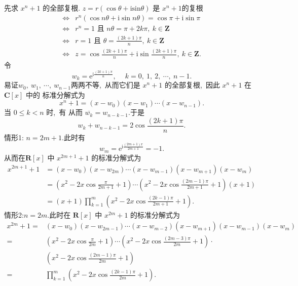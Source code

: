 \begin{solution}
	先求 $ x^{n}+1 $ 的全部复根.
	$z=r(\cos \theta+\mathrm{isin} \theta) $ 是 $ x^{n}+1  $的复根
	$$\begin{aligned}
		\Longleftrightarrow & r^{n}(\cos n \theta+\mathrm{i} \sin n \theta)=\cos \pi+\mathrm{i} \sin \pi \\
		\Longleftrightarrow & r^{n}=1 \text { 且 } n \theta=\pi+2 k \pi,\  k \in \mathbf{Z} \\
		\Longleftrightarrow & r=1 \text { 且 } \theta=\frac{(2 k+1) \pi}{n},\  k \in \mathbf{Z} \\
		\Longleftrightarrow & z=\cos \frac{(2 k+1) \pi}{n}+\mathrm{i} \sin \frac{(2 k+1) \pi}{n},\  k \in \mathbf{Z} .
	\end{aligned}$$
	令$$w_{k}=\mathrm{e}^{\mathrm{i} \frac{(2 k+1) \pi}{n}},\  \quad k=0,\ 1,\ 2,\  \cdots,\  n-1 .$$
	易证$  w_{0},\  w_{1},\  \cdots,\  w_{n-1}  $两两不等,\  从而它们是  $x^{n}+1 $ 的全部复根,\  因此 $ x^{n}+1$  在$  \mathbf{C}[x]$  中的 标准分解式为
	$$x^{n}+1=\left(x-w_{0}\right)\left(x-w_{1}\right) \cdots\left(x-w_{n-1}\right) .$$
	当 $ 0 \leqslant k<n $ 时,\  有
	从而  $\overline{w_{k}}=w_{n-k-1}  .$于是
	$$w_{k}+w_{n-k-1}=2 \cos \frac{(2 k+1) \pi}{n} .$$
	情形1: $n=2 m+1  .$此时有
	$$w_{m}=\mathrm{e}^{\mathrm{i} \frac{(2 m+1) x}{2 m+1}}=-1 .$$
	从而在$  \mathbf{R}[x] $ 中 $ x^{2 m+1}+1 $ 的标准分解式为
	$$\begin{aligned}
		x^{2 m+1}+1&=\left(x-w_{0}\right)\left(x-w_{2 m}\right) \cdots\left(x-w_{m-1}\right)\left(x-w_{m+1}\right)\left(x-w_{m}\right)\\
		&=\left(x^{2}-2 x \cos \frac{\pi}{2 m+1}+1\right) \cdots\left(x^{2}-2 x \cos \frac{(2 m-1) \pi}{2 m+1}+1\right)(x+1) \\
		&=(x+1) \prod_{k=1}^{m}\left(x^{2}-2 x \cos \frac{(2 k-1) \pi}{2 m+1}+1\right) .
	\end{aligned}$$
	情形2:$n=2 m  .$此时在 $ \mathbf{R}[x] $ 中 $ x^{2 m}+1 $ 的标准分解式为
	$$\begin{aligned}
		x^{2 m}+1= & \left(x-w_{0}\right)\left(x-w_{2 m-1}\right) \cdots\left(x-w_{m-2}\right)\left(x-w_{m+1}\right)\left(x-w_{m-1}\right)\left(x-w_{m}\right) \\
		= & \left(x^{2}-2 x \cos \frac{\pi}{2 m}+1\right) \cdots\left(x^{2}-2 x \cos \frac{(2 m-3) \pi}{2 m}+1\right) \cdot \\
		& \left(x^{2}-2 x \cos \frac{(2 m-1) \pi}{2 m}+1\right) \\
		= & \prod_{k=1}^{m}\left(x^{2}-2 x \cos \frac{(2 k-1) \pi}{2 m}+1\right) .
	\end{aligned}$$
\end{solution}
